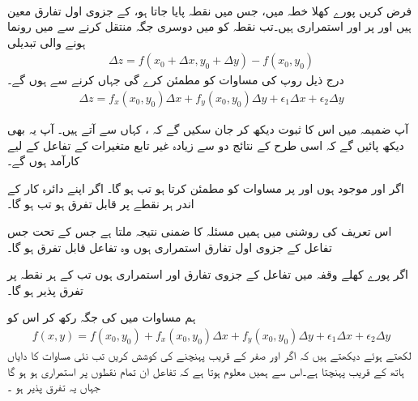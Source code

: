 \\
فرض کریں    پورے کھلا  خطہ  میں، جس میں نقطہ  پایا جاتا ہو،      کے    جزوی  اول تفارق  معین  ہیں اور  پر  اور  استمراری ہیں۔تب نقطہ  کو  میں    دوسری جگہ   منتقل کرنے سے  میں رونما ہونے والی تبدیلی
\begin{align*}
\Delta z=f(x_0+\Delta x,y_0+\Delta y)-f(x_0,y_0)
\end{align*}
 درج ذیل روپ  کی مساوات کو مطمئن کرے گی جہاں   کرنے سے  ہوں  گے۔
\begin{align}\label{مساوات_کثیرالمتغیر_تفریق_تعریف_الف}
\Delta z=f_x(x_0,y_0)\Delta x+f_y(x_0,y_0)\Delta y+\epsilon_1\Delta x+\epsilon_2\Delta y
\end{align}

آپ ضمیمہ  میں  اس کا ثبوت  دیکھ کر جان سکیں گے کہ ،  کہاں سے آتے ہیں۔  آپ یہ بھی دیکھ پائیں گے کہ اسی طرح کے نتائج دو سے زیادہ  غیر تابع متغیرات کے تفاعل کے لیے کارآمد ہوں گے۔

اگر    اور   موجود ہوں اور  پر  مساوات   کو مطمئن کرتا ہو تب   ہو گا۔  اگر  اپنے دائرہ کار کے اندر ہر نقطے پر قابل تفرق ہو تب  ہو گا۔

اس تعریف کی روشنی میں ہمیں مسئلہ  کا  ضمنی نتیجہ ملتا ہے جس کے تحت  جس تفاعل کے   جزوی اول   تفارق استمراری ہوں وہ تفاعل قابل تفرق ہو گا۔

اگر پورے کھلے  وقفہ  میں تفاعل  کے جزوی تفارق  اور  استمراری ہوں تب  کے ہر نقطہ  پر  تفرق پذیر ہو گا۔

  ہم مساوات  میں  کی جگہ   رکھ کر اس کو
\begin{align}\label{مساوات_کثیرالمتغیر_نقطہ_پر_تفاعل_کی_قیمت}
f(x,y)=f(x_0,y_0)+f_x(x_0,y_0)\Delta x+f_y(x_0,y_0)\Delta y+\epsilon_1\Delta x+\epsilon_2\Delta y
\end{align}
لکھتے ہوئے دیکھتے ہیں کہ   اگر  اور  صفر کے قریب پہنچنے کی کوشش کریں    تب نئی مساوات کا دایاں ہاتھ  کے قریب پہنچتا ہے۔اس سے ہمیں معلوم ہوتا ہے کہ تفاعل   ان تمام نقطوں پر  استمراری ہو  ہو گا جہاں یہ تفرق پذیر  ہو ۔


